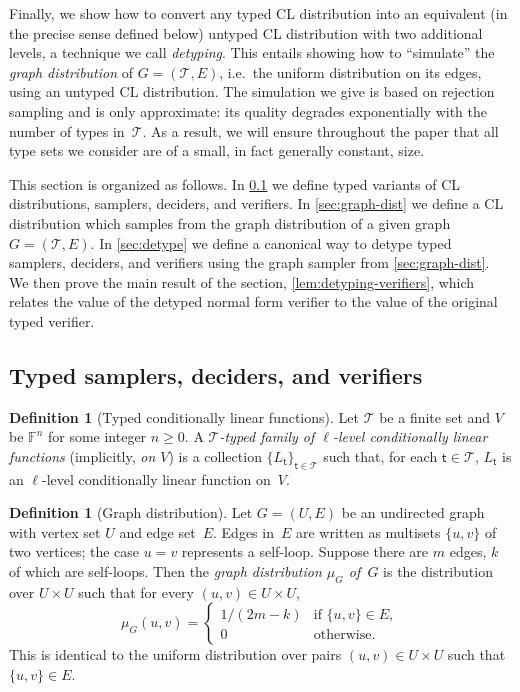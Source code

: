 \documentclass[11pt]{article}
\theoremstyle{definition}
\newtheorem{definition}[theorem]{Definition}
\newcommand{\F}{\ensuremath{\mathbb{F}}}
\newcommand{\type}{\mathcal{T}}
\newcommand{\tvarstyle}[1]{\mathsf{#1}}
\newcommand{\tvar}{\ensuremath{\tvarstyle{t}}}
\begin{document}
Finally, we show how to convert any typed CL distribution into an equivalent (in
the precise sense defined below) untyped CL distribution with two additional
levels, a technique we call \emph{detyping}.
This entails showing how to ``simulate'' the \emph{graph distribution} of $G =
(\type, E)$, i.e.\ the uniform distribution on its edges, using an untyped CL
distribution.
The simulation we give is based on rejection sampling and is only approximate:
its quality degrades exponentially with the number of types in~$\type$.
As a result, we will ensure throughout the paper that all type sets we consider
are of a small, in fact generally constant, size.

This section is organized as follows.
In \cref{sec:typed-samplers} we define typed variants of CL distributions,
samplers, deciders, and verifiers.
In \cref{sec:graph-dist} we define a CL distribution which samples from the
graph distribution of a given graph $G = (\type, E)$.
In \cref{sec:detype} we define a canonical way to detype typed samplers,
deciders, and verifiers using the graph sampler from \cref{sec:graph-dist}.
We then prove the main result of the section, \cref{lem:detyping-verifiers},
which relates the value of the detyped normal form verifier to the value of
the original typed verifier.

\subsection{Typed samplers, deciders, and verifiers}
\label{sec:typed-samplers}

\begin{definition}[Typed conditionally linear functions]
  Let $\type$ be a finite set and $V$ be $\F^n$ for some integer $n \geq 0$.
  A \emph{$\type$-typed family of $\ell$-level conditionally linear functions}
  (implicitly, \emph{on $V$}) is a collection $\{L_\tvar\}_{\tvar \in \type}$
  such that, for each $\tvar \in \type$, $L_\tvar$ is an $\ell$-level
  conditionally linear function on~$V$.
\end{definition}

\begin{definition}[Graph distribution]
  \label{def:graph-distribution}
  Let $G = (U, E)$ be an undirected graph with vertex set $U$ and edge set~$E$.
  Edges in~$E$ are written as multisets $\{u, v\}$ of two vertices; the case $u
  = v$ represents a self-loop.
  Suppose there are $m$ edges, $k$ of which are self-loops.
  Then the \emph{graph distribution $\mu_G$ of~$G$} is the distribution over
  $U\times U$ such that for every $(u, v)\in U\times U$,
  \begin{equation*}
    \mu_G(u, v) =
    \begin{cases}
      1/(2m-k) & \text{if $\{u, v\} \in E$},\\
      0 & \text{otherwise}.
    \end{cases}
  \end{equation*}
  This is identical to the uniform distribution over pairs $(u, v)\in U\times U$
  such that $\{u, v\} \in E$.
\end{definition}
\end{document}

